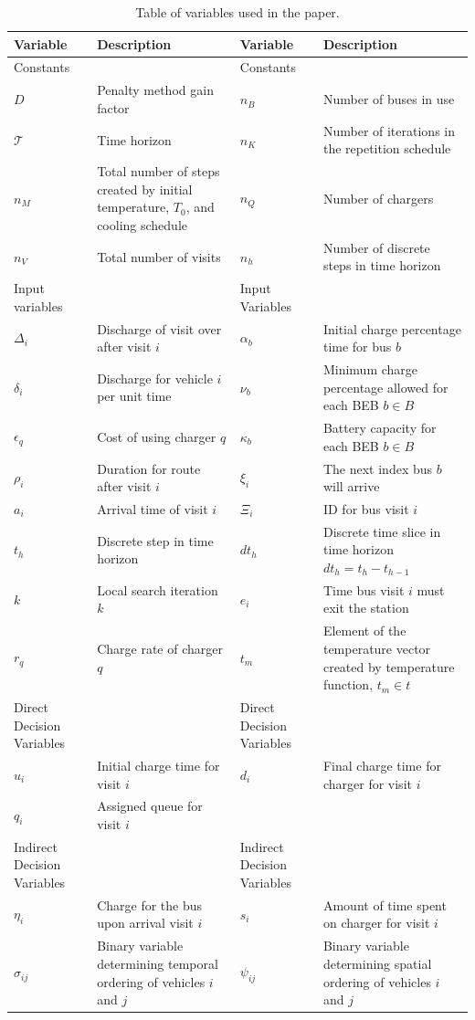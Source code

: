 \documentclass[11pt,a4paper,final]{article}
\newcommand{\T}{\mathcal{T}}                %
\newcommand{\Tau}{T}                        %
\newcommand{\Bset}{B}                       %
\begin{document}
\begin{table}[htbp]
\caption{\label{tab:variables}Table of variables used in the paper.}
\centering
\begin{tabularx}{\textwidth}{L{0.3} L{1.2} L{0.3} L{1.2}}
\textbf{Variable} & \textbf{Description} & \textbf{Variable} & \textbf{Description}\\[0pt]
\hline
Constants &  & Constants & \\[0pt]
\(D\) & Penalty method gain factor & \(n_B\) & Number of buses in use\\[0pt]
\(\T\) & Time horizon & \(n_K\) & Number of iterations in the repetition schedule\\[0pt]
\(n_M\) & Total number of steps created by initial temperature, \(\Tau_0\), and cooling schedule & \(n_Q\) & Number of chargers\\[0pt]
\(n_V\) & Total number of visits & \(n_h\) & Number of discrete steps in time horizon\\[0pt]
\hline
Input variables &  & Input Variables & \\[0pt]
\(\Delta_i\) & Discharge of visit over after visit \(i\) & \(\alpha_b\) & Initial charge percentage time for bus \(b\)\\[0pt]
\(\delta_i\) & Discharge for vehicle \(i\) per unit time & \(\nu_b\) & Minimum charge percentage allowed for each BEB \(b \in \Bset\)\\[0pt]
\(\epsilon_q\) & Cost of using charger \(q\) & \(\kappa_b\) & Battery capacity for each BEB \(b \in \Bset\)\\[0pt]
\(\rho_i\) & Duration for route after visit \(i\) & \(\xi_i\) & The next index bus \(b\) will arrive\\[0pt]
\(a_i\) & Arrival time of visit \(i\) & \(\Xi_i\) & ID for bus visit \(i\)\\[0pt]
\(t_h\) & Discrete step in time horizon & \(dt_h\) & Discrete time slice in time horizon \(dt_h = t_h - t_{h-1}\)\\[0pt]
\(k\) & Local search iteration \(k\) & \(e_i\) & Time bus visit \(i\) must exit the station\\[0pt]
\(r_q\) & Charge rate of charger \(q\) & \(t_m\) & Element of the temperature vector created by temperature function, \(t_m \in t\)\\[0pt]
\hline
Direct Decision Variables &  & Direct Decision Variables & \\[0pt]
\(u_i\) & Initial charge time for visit \(i\) & \(d_i\) & Final charge time for charger for visit \(i\)\\[0pt]
\(q_i\) & Assigned queue for visit \(i\) &  & \\[0pt]
Indirect Decision Variables &  & Indirect Decision Variables & \\[0pt]
\(\eta_i\) & Charge for the bus upon arrival visit \(i\) & \(s_i\) & Amount of time spent on charger for visit \(i\)\\[0pt]
\(\sigma_{ij}\) & Binary variable determining temporal ordering of vehicles \(i\) and \(j\) & \(\psi_{ij}\) & Binary variable determining spatial ordering of vehicles \(i\) and \(j\)\\[0pt]
\hline
\end{tabularx}
\end{table}
\end{document}
